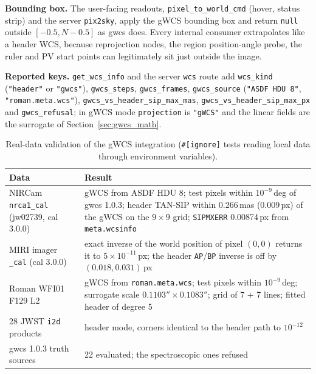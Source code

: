 \documentclass[11pt,a4paper]{article}
\newcommand{\code}[1]{\texttt{\small #1}}
\begin{document}
    \textbf{Bounding box.} The user-facing readouts, \code{pixel\_to\_world\_cmd} (hover, status strip) and the server \code{pix2sky}, apply the gWCS bounding box and return \code{null} outside $[-0.5, N-0.5]$ as gwcs does. Every internal consumer extrapolates like a header WCS, because reprojection nodes, the region position-angle probe, the ruler and PV start points can legitimately sit just outside the image.

    \textbf{Reported keys.} \code{get\_wcs\_info} and the server \code{wcs} route add \code{wcs\_kind} (\code{"header"} or \code{"gwcs"}), \code{gwcs\_steps}, \code{gwcs\_frames}, \code{gwcs\_source} (\code{"ASDF HDU 8"}, \code{"roman.meta.wcs"}), \code{gwcs\_vs\_header\_sip\allowbreak\_max\_mas}, \code{gwcs\_vs\_header\_sip\allowbreak\_max\_px} and \code{gwcs\_refusal}; in gWCS mode \code{projection} is \code{"gWCS"} and the linear fields are the surrogate of Section~\ref{sec:gwcs_math}.

    \begin{table}[H]
        \centering
        \small
        \begin{tabularx}{\textwidth}{lX}
            \toprule
            \textbf{Data} & \textbf{Result} \\
            \midrule
            NIRCam \code{nrca1\_cal} (jw02739, cal 3.0.0) & gWCS from ASDF HDU 8; test pixels within $10^{-9}$\,deg of gwcs 1.0.3; header TAN-SIP within 0.266\,mas (0.009\,px) of the gWCS on the $9 \times 9$ grid; \code{SIPMXERR} 0.00874\,px from \code{meta.wcsinfo} \\
            MIRI imager \code{\_cal} (cal 3.0.0) & exact inverse of the world position of pixel $(0,0)$ returns it to $5 \times 10^{-11}$\,px; the header \code{AP}/\code{BP} inverse is off by $(0.018, 0.031)$\,px \\
            Roman WFI01 F129 L2 & gWCS from \code{roman.meta.wcs}; test pixels within $10^{-9}$\,deg; surrogate scale $0.1103'' \times 0.1083''$; grid of 7 + 7 lines; fitted header of degree 5 \\
            28 JWST \code{i2d} products & header mode, corners identical to the header path to $10^{-12}$ \\
            gwcs 1.0.3 truth sources & 22 evaluated; the spectroscopic ones refused \\
            \bottomrule
        \end{tabularx}
        \caption{Real-data validation of the gWCS integration (\code{\#[ignore]} tests reading local data through environment variables).}
    \end{table}
\end{document}
